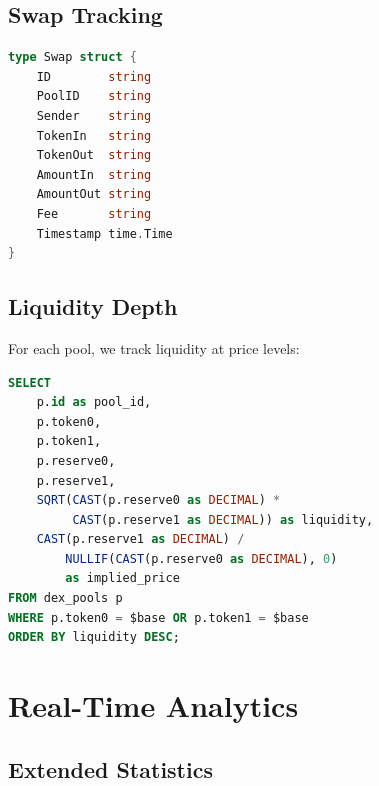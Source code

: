 \documentclass[11pt,twocolumn]{article}
\begin{document}
\subsection{Swap Tracking}

\begin{lstlisting}[language=Go,caption={Swap event structure}]
type Swap struct {
    ID        string
    PoolID    string
    Sender    string
    TokenIn   string
    TokenOut  string
    AmountIn  string
    AmountOut string
    Fee       string
    Timestamp time.Time
}
\end{lstlisting}

\subsection{Liquidity Depth}

For each pool, we track liquidity at price levels:

\begin{lstlisting}[language=SQL,caption={Liquidity depth query}]
SELECT
    p.id as pool_id,
    p.token0,
    p.token1,
    p.reserve0,
    p.reserve1,
    SQRT(CAST(p.reserve0 as DECIMAL) *
         CAST(p.reserve1 as DECIMAL)) as liquidity,
    CAST(p.reserve1 as DECIMAL) /
        NULLIF(CAST(p.reserve0 as DECIMAL), 0)
        as implied_price
FROM dex_pools p
WHERE p.token0 = $base OR p.token1 = $base
ORDER BY liquidity DESC;
\end{lstlisting}

\section{Real-Time Analytics}

\subsection{Extended Statistics}
\end{document}
